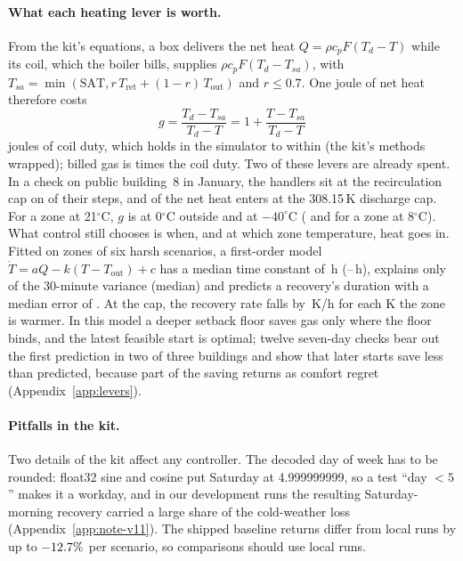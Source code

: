 \documentclass{article}
\begin{document}
\paragraph{What each heating lever is worth.}
From the kit's equations, a box delivers the net heat $Q=\rho c_p F (T_d - T)$ while its coil, which the boiler bills, supplies $\rho c_p F (T_d - T_{sa})$, with $T_{sa}=\min(\text{SAT}, r\,T_{\text{ret}} + (1-r)\,T_{\text{out}})$ and $r\le 0.7$. One joule of net heat therefore costs
\begin{equation}
g = \frac{T_d - T_{sa}}{T_d - T} = 1 + \frac{T - T_{sa}}{T_d - T}
\label{eq:g}
\end{equation}
joules of coil duty, which holds in the simulator to within \RSevGErr{} (the kit's methods wrapped); billed gas is \RSevGasOverCoil{} times the coil duty.
Two of these levers are already spent. In a check on public building~8 in January, the handlers sit at the recirculation cap on \RSevRecircCapShare{} of their steps, and \RSevCapHeatShare{} of the net heat enters at the 308.15\,K discharge cap. For a zone at 21$^\circ$C, $g$ is \RSevGZero{} at 0$^\circ$C outside and \RSevGMinusForty{} at $-40^\circ$C (\RSevGColdZero{} and \RSevGColdMinusForty{} for a zone at 8$^\circ$C). What control still chooses is when, and at which zone temperature, heat goes in. Fitted on \RSevNZones{} zones of six harsh scenarios, a first-order model $\dot T = aQ - k(T - T_{\text{out}}) + c$ has a median time constant of \RSevTauMed\,h (\RSevTauLo--\RSevTauHi\,h), explains only \RSevRTwo{} of the 30-minute variance (median) and predicts a recovery's duration with a median error of \RSevRecErr. At the cap, the recovery rate falls by \RSevRateSlope\,K/h for each K the zone is warmer. In this model a deeper setback floor saves gas only where the floor binds, and the latest feasible start is optimal; twelve seven-day checks bear out the first prediction in two of three buildings and show that later starts save less than predicted, because part of the saving returns as comfort regret (Appendix~\ref{app:levers}).

\paragraph{Pitfalls in the kit.} Two details of the kit affect any controller. The decoded day of week has to be rounded: float32 sine and cosine put Saturday at 4.999999999, so a test ``day $<5$'' makes it a workday, and in our development runs the resulting Saturday-morning recovery carried a large share of the cold-weather loss (Appendix~\ref{app:note-v11}). The shipped baseline returns differ from local runs by up to $-12.7\%$ per scenario, so comparisons should use local runs.
\end{document}

